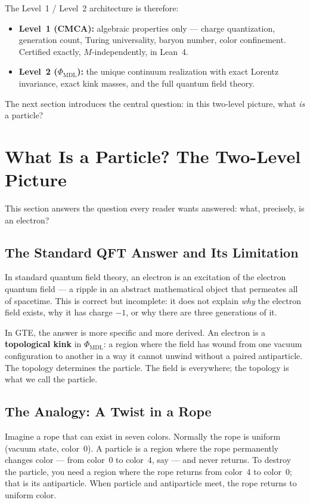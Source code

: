 \documentclass[11pt,openany]{book}
\theoremstyle{remark}
\newcommand{\PHIMDL}{\Phi_{\mathrm{MDL}}}
\begin{document}
The Level~1 / Level~2 architecture is therefore:
\begin{itemize}[itemsep=2pt]
\item \textbf{Level~1 (CMCA):} algebraic properties only --- charge quantization,
  generation count, Turing universality, baryon number, color confinement.
  Certified exactly, $M$-independently, in Lean~4.
\item \textbf{Level~2 ($\PHIMDL$):} the unique continuum realization with exact
  Lorentz invariance, exact kink masses, and the full quantum field theory.
\end{itemize}

\noindent
The next section introduces the central question: in this two-level picture, what
\emph{is} a particle?

\section{What Is a Particle? The Two-Level Picture}
\label{sec:two_levels}

This section answers the question every reader wants answered: what, precisely, is an electron?

\subsection*{The Standard QFT Answer and Its Limitation}

In standard quantum field theory, an electron is an excitation of the electron quantum
field --- a ripple in an abstract mathematical object that permeates all of spacetime.
This is correct but incomplete: it does not explain \emph{why} the electron field exists,
why it has charge $-1$, or why there are three generations of it.

In GTE, the answer is more specific and more derived.
An electron is a \textbf{topological kink} in $\PHIMDL$: a region where the field has wound
from one vacuum configuration to another in a way it cannot unwind without a paired
antiparticle.
The topology determines the particle.
The field is everywhere; the topology is what we call the particle.

\subsection*{The Analogy: A Twist in a Rope}

Imagine a rope that can exist in seven colors.
Normally the rope is uniform (vacuum state, color~0).
A particle is a region where the rope permanently changes color --- from color~0 to color~4,
say --- and never returns.
To destroy the particle, you need a region where the rope returns from color~4 to color~0;
that is its antiparticle.
When particle and antiparticle meet, the rope returns to uniform color.
\end{document}
